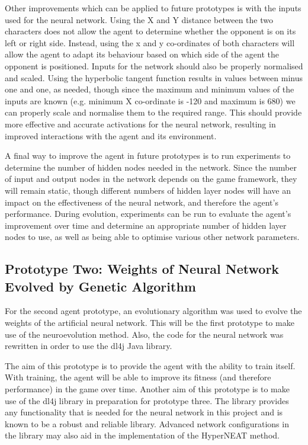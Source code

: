 \documentclass[12pt,a4paper]{article}
\begin{document}
Other improvements which can be applied to future prototypes is with the inputs used for the neural network. Using the X and Y distance between the two characters does not allow the agent to determine whether the opponent is on its left or right side. Instead, using the x and y co-ordinates of both characters will allow the agent to adapt its behaviour based on which side of the agent the opponent is positioned. Inputs for the network should also be properly normalised and scaled. Using the hyperbolic tangent function results in values between minus one and one, as needed, though since the maximum  and minimum values of the inputs are known (e.g. minimum X co-ordinate is -120 and maximum is 680) we can properly scale and normalise them to the required range. This should provide more effective and accurate activations for the neural network, resulting in improved interactions with the agent and its environment.
 
A final way to improve the agent in future prototypes is to run experiments to determine the number of hidden nodes needed in the network. Since the number of input and output nodes in the network depends on the game framework, they will remain static, though different numbers of hidden layer nodes will have an impact on the effectiveness of the neural network, and therefore the agent's performance. During evolution, experiments can be run to evaluate the agent's improvement over time and determine an appropriate number of hidden layer nodes to use, as well as being able to optimise various other network parameters.
\newpage
\subsection{Prototype Two: Weights of Neural Network Evolved by Genetic Algorithm}
For the second agent prototype, an evolutionary algorithm was used to evolve the weights of the artificial neural network. This will be the first prototype to make use of the neuroevolution method. Also, the code for the neural network was rewritten in order to use the dl4j Java library.

The aim of this prototype is to provide the agent with the ability to train itself. With training, the agent will be able to improve its fitness (and therefore performance) in the game over time. Another aim of this prototype is to make use of the dl4j library in preparation for prototype three. The library provides any functionality that is needed for the neural network in this project and is known to be a robust and reliable library. Advanced network configurations in the library may also aid in the implementation of the HyperNEAT method. 
\end{document}
